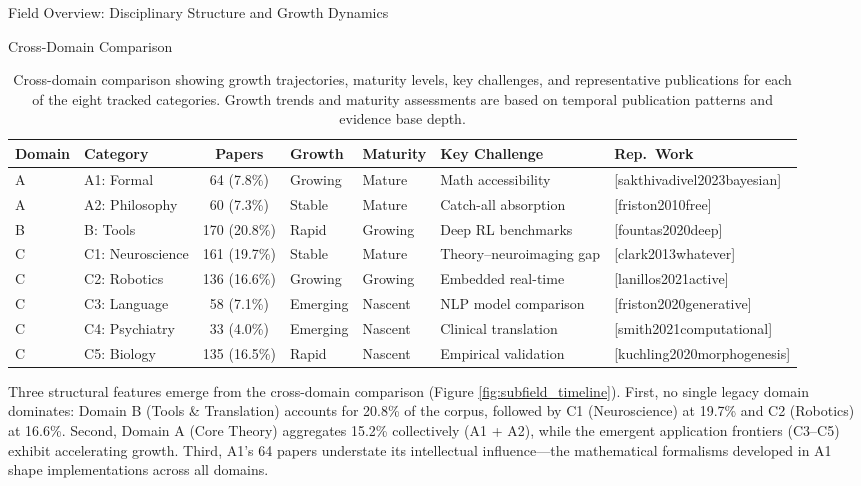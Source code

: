 \documentclass[
  ignorenonframetext,
]{beamer}
\providecommand{\citep}[1]{[#1]}
\begin{document}
\begin{frame}[allowframebreaks]{Field Overview: Disciplinary Structure
and Growth Dynamics \label{sec:field_overview}}
\begin{block}{Cross-Domain Comparison}
\protect{}\label{cross-domain-comparison}
\begin{table}[htbp]
\centering
\caption{Cross-domain comparison showing growth trajectories, maturity levels, key challenges, and representative publications for each of the eight tracked categories. Growth trends and maturity assessments are based on temporal publication patterns and evidence base depth.}
\label{tab:cross_domain_comparison}
\begin{tabular}{llcllll}
\toprule
\textbf{Domain} & \textbf{Category} & \textbf{Papers} & \textbf{Growth} & \textbf{Maturity} & \textbf{Key Challenge} & \textbf{Rep.\ Work} \\
\midrule
A & A1: Formal & 64 (7.8\%) & Growing & Mature & Math accessibility & \citep{sakthivadivel2023bayesian} \\
A & A2: Philosophy & 60 (7.3\%) & Stable & Mature & Catch-all absorption & \citep{friston2010free} \\
B & B: Tools & 170 (20.8\%) & Rapid & Growing & Deep RL benchmarks & \citep{fountas2020deep} \\
C & C1: Neuroscience & 161 (19.7\%) & Stable & Mature & Theory--neuroimaging gap & \citep{clark2013whatever} \\
C & C2: Robotics & 136 (16.6\%) & Growing & Growing & Embedded real-time & \citep{lanillos2021active} \\
C & C3: Language & 58 (7.1\%) & Emerging & Nascent & NLP model comparison & \citep{friston2020generative} \\
C & C4: Psychiatry & 33 (4.0\%) & Emerging & Nascent & Clinical translation & \citep{smith2021computational} \\
C & C5: Biology & 135 (16.5\%) & Rapid & Nascent & Empirical validation & \citep{kuchling2020morphogenesis} \\
\bottomrule
\end{tabular}
\end{table}

Three structural features emerge from the cross-domain comparison
(Figure \ref{fig:subfield_timeline}). First, no single legacy domain
dominates: Domain B (Tools \& Translation) accounts for 20.8\% of the
corpus, followed by C1 (Neuroscience) at 19.7\% and C2 (Robotics) at
16.6\%. Second, Domain A (Core Theory) aggregates 15.2\% collectively
(A1 + A2), while the emergent application frontiers (C3--C5) exhibit
accelerating growth. Third, A1's 64 papers understate its intellectual
influence---the mathematical formalisms developed in A1 shape
implementations across all domains.


\end{block}
\end{frame}
\end{document}
